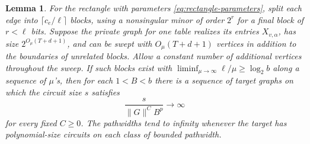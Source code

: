 \documentclass[11pt]{article}
\newtheorem{lemma}[theorem]{Lemma}
\theoremstyle{definition}
\begin{document}
\begin{lemma}\label{lem:transfer}
For the rectangle with parameters \eqref{eq:rectangle-parameters}, split each edge into \(\lceil c_e/\ell\rceil\) blocks, using a nonsingular minor of order \(2^r\) for a final block of \(r<\ell\) bits. Suppose the private graph for one table realizes its entries \(X_{v,\alpha}\), has size \(2^{O_\mu(T+d+1)}\), and can be swept with \(O_\mu(T+d+1)\) vertices in addition to the boundaries of unrelated blocks. Allow a constant number of additional vertices throughout the sweep. If such blocks exist with \(\liminf_{\mu\to\infty}\ell/\mu\ge\log_2 b\) along a sequence of \(\mu\)'s, then for each \(1<B<b\) there is a sequence of target graphs on which the circuit size \(s\) satisfies
\[
                    \frac{s}{\|G\|^C B^p}\longrightarrow\infty
\]
for every fixed \(C\ge0\). The pathwidths tend to infinity whenever the target has polynomial-size circuits on each class of bounded pathwidth.
\end{lemma}
\end{document}
